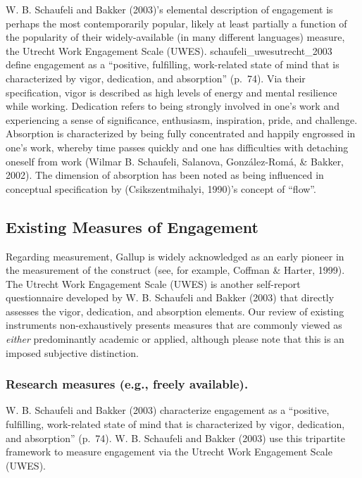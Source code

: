\documentclass[
  man]{apa7}
\begin{document}
W. B. Schaufeli and Bakker (2003)'s elemental description of engagement is perhaps the most contemporarily popular, likely at least partially a function of the popularity of their widely-available (in many different languages) measure, the Utrecht Work Engagement Scale (UWES). schaufeli\_uwesutrecht\_2003 define engagement as a ``positive, fulfilling, work-related state of mind that is characterized by vigor, dedication, and absorption'' (p.~74). Via their specification, vigor is described as high levels of energy and mental resilience while working. Dedication refers to being strongly involved in one's work and experiencing a sense of significance, enthusiasm, inspiration, pride, and challenge. Absorption is characterized by being fully concentrated and happily engrossed in one's work, whereby time passes quickly and one has difficulties with detaching oneself from work (Wilmar B. Schaufeli, Salanova, González-Romá, \& Bakker, 2002). The dimension of absorption has been noted as being influenced in conceptual specification by (Csikszentmihalyi, 1990)'s concept of ``flow''.

\hypertarget{existing-measures-of-engagement}{%
\subsection{Existing Measures of Engagement}\label{existing-measures-of-engagement}}

Regarding measurement, Gallup is widely acknowledged as an early pioneer in the measurement of the construct (see, for example, Coffman \& Harter, 1999). The Utrecht Work Engagement Scale (UWES) is another self-report questionnaire developed by W. B. Schaufeli and Bakker (2003) that directly assesses the vigor, dedication, and absorption elements. Our review of existing instruments non-exhaustively presents measures that are commonly viewed as \emph{either} predominantly academic or applied, although please note that this is an imposed subjective distinction.

\hypertarget{research-measures-e.g.-freely-available.}{%
\subsubsection{Research measures (e.g., freely available).}\label{research-measures-e.g.-freely-available.}}

W. B. Schaufeli and Bakker (2003) characterize engagement as a ``positive, fulfilling, work-related state of mind that is characterized by vigor, dedication, and absorption'' (p.~74). W. B. Schaufeli and Bakker (2003) use this tripartite framework to measure engagement via the Utrecht Work Engagement Scale (UWES).
\end{document}

